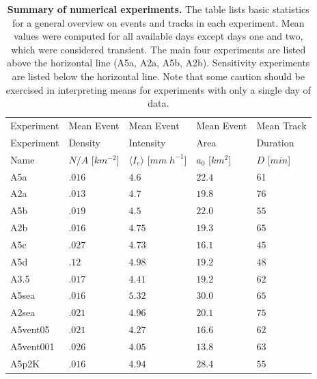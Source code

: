 \documentclass[draft,linenumbers]{agujournal2019}
\begin{document}
\begin{table}[b]
\centering
\begin{tabular}{lllll}
    Experiment & Mean Event & Mean Event & Mean Event & Mean Track\\
    Experiment & Density & Intensity & Area & Duration\\
    Name & $N/A$ [$km^{-2}$] & $\langle I_e\rangle$ [$mm\;h^{-1}$] & $a_0$ [$km^2$] & $D$ [$min$]\\
    \hline
    A5a & $.016$ & $4.6$ & $22.4$ & 61 \\
    A2a & $.013$ & $4.7$ & $19.8$ & 76\\
    A5b & $.019$ & $4.5$ & $22.0$ & $55$\\
    A2b & $.016$ & $4.75$ & $19.3$ & $65$\\
    \hline
    A5c & $.027$ & $4.73$ & $16.1$ & $45$\\
    A5d & $.12$ & $4.98$ & $19.2$ & $48$\\
    A3.5 & $.017$ & $4.41$ & $19.2$ & $62$\\
    A5sea & $.016$ & $5.32$ & $30.0$ & $65$\\
    A2sea & $.021$ & $4.96$ & $20.1$ & $75$\\
    A5vent05 & $.021$ & $4.27$ & $16.6$ & $62$\\
    A5vent001 & $.026$ & $4.05$ & $13.8$ & $63$\\
    A5p2K & $.016$ & $4.94$ & $28.4$ & $55$\\
    \hline
\end{tabular}
\caption{{\bf Summary of numerical experiments.}
The table lists basic statistics for a general overview on events and tracks in each experiment. 
Mean values were computed for all available days except days one and two, which were considered transient. 
The main four experiments are listed above the horizontal line (A5a, A2a, A5b, A2b). 
Sensitivity experiments are listed below the horizontal line. 
Note that some caution should be exercised in interpreting means for experiments with only a single day of data.
}
\label{tab:basic_stats}
\end{table}
\end{document}
